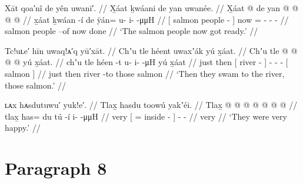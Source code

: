 \ex\label{ex:100-115-fish-people-ready}%
%
\begingl
	\glpreamble	Xāt qoa′nî de yên uwanī′. //
	\glpreamble	X̱áat ḵwáani de yan uwanée. //
	\gla	{} X̱áat  @ {} {} de 
		yan @   @ {} @ {} @ {} //
	\glb	{} x̱áat ḵwáan -í {} de 
		ÿán= u- i-  -μμH //
	\glc	{}[ salmon people - {}] now 
		= - -  - //
	\gld	{} salmon people –of {} now
		done  {} {} {} //
	\glft	‘The salmon people now got ready.’
		//
\endgl
\xe

\ex\label{ex:100-116-fish-people-ready}%
%
\begingl
	\glpreamble	Tc!uʟe′ hīn uwaq!ᴀ′q yū′xāt. //
	\glpreamble	Chʼu tle héent uwaxʼák yú x̱áat. //
	\gla	Chʼu tle {}  @ {} {} 
		 @ {} @ {} @ {} 
		{} yú x̱áat. {} //
	\glb	chʼu tle {} héen -t {} 
		u- i-  -μH 
		{} yú x̱áat {} //
	\glc	just then {}[ river - {}]
		- -  -
		{}[  salmon {}] //
	\gld	just then {} river -to {} 
		 {} {} {} 
		{} those salmon {} //
	\glft	‘Then they swam to the river, those salmon.’
		//
\endgl
\xe

\ex\label{ex:100-117-they-are-very-happy}%
%
\begingl
	\glpreamble	ʟᴀx hᴀsdutuwu′ yuk!e′. //
	\glpreamble	Tlax̱ hasdu toowú yakʼéi. //
	\gla	Tlax̱ {}  @ {}  @ {} {} 
		 @ {} @ {} @ {} @ {} @ {} //
	\glb	tlax̱ {} has= du tú -í {}
		i-  -μμH //
	\glc	very {}[ =  inside - {}]
		-  - //
	\gld	very {}  {}  {} {} 
		 {} {} //
	\glft	‘They were very happy.’
		//
\endgl
\xe

\section{Paragraph 8}\label{sec:100-para-8}

